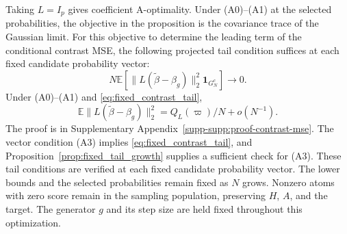 \documentclass[pdflatex,iicol,sn-mathphys-ay]{sn-jnl}
\theoremstyle{thmstyleone}
\theoremstyle{thmstylethree}
\theoremstyle{thmstyletwo}
\newcommand{\E}{\mathbb E}
\begin{document}
Taking $L=I_p$ gives coefficient A-optimality.
Under (A0)--(A1) at the selected probabilities, the objective in the
proposition is the covariance trace of the Gaussian limit.
For this objective to determine the leading term of the conditional contrast
MSE, the following projected tail condition suffices at each fixed candidate
probability vector:
\begin{equation}\label{eq:fixed_contrast_tail}
 N\E\!\left[\|L(\widetilde\beta-\beta_g)\|_2^2
                    \mathbf{1}_{G_N^c}\right]\longrightarrow0.
\end{equation}
Under (A0)--(A1) and \eqref{eq:fixed_contrast_tail},
\[
 \E\|L(\widetilde\beta-\beta_g)\|_2^2
       =Q_L(\varpi)/N+o(N^{-1}).
\]
The proof is in Supplementary Appendix~\ref{supp-supp:proof-contrast-mse}.
The vector condition (A3) implies \eqref{eq:fixed_contrast_tail}, and
Proposition~\ref{prop:fixed_tail_growth} supplies a sufficient check for (A3).
These tail conditions are verified at each fixed candidate probability vector.
The lower bounds and the selected probabilities remain fixed as $N$ grows.
Nonzero atoms with zero score remain in the sampling population, preserving
$H$, $A$, and the target. The generator $g$ and its step size are held fixed
throughout this optimization.
\end{document}
